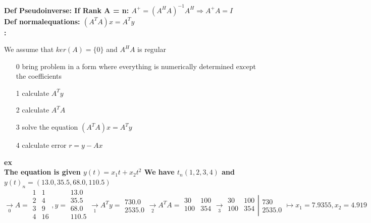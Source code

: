 \documentclass[7pt,landscape, margin = 0.1mm]{article}
\newcommand{\COL}[1]{ \color{chaptercolor} \bf{#1}\color{black}     \\}
\newcommand{\KRZ}[2]{\vspace{1mm} \hline \vspace{1mm} \color{chaptercolor}{RC #1}:\color{black} \   \hspace{0.2cm}\vspace{1mm}   {\begin{minipage}{20em}
#2 \end{minipage}} \vspace{1mm}  \hline \vspace{1mm}  \\}
\newcommand{\DEF}[2]{\color{chaptercolor}\bf{Def #1}:\color{black}    \hspace{0.2cm} #2 \\}
\begin{document}
\begin{multicols}{4}
\begin{flushleft}
\DEF{Pseudoinverse}{If Rank A = n: $A^+= (A^HA)^{-1}A^H \Rightarrow A^+A=I $}
\DEF{normalequations}{$ (A^TA)x = A^Ty  $}
\KRZ{Least Square Method for functions}{We assume that $ ker(A)=\{0\}$ and $A^HA $ is regular
\begin{itemize}
\item[0] bring problem in a form where everything is numerically determined except the coefficients
\item[1] calculate $A^Ty $
\item[2] calculate $A^TA $
\item[3] solve the equation $(A^TA)x = A^Ty $ 
\item[4] calculate error $r = y-Ax $
\end{itemize}
\COL{ex} The equation is given $y(t)= x_1 t + x_2t^2 $ We have $t_n (1,2,3,4)$ and $y(t)_n = (13.0,35.5,68.0,110.5)$
$\xrightarrow[0]{}A=\begin{smallmatrix}
 1&  1\\
 2& 4 \\
 3& 9 \\
4 &  16\\
\end{smallmatrix}, y = \begin{smallmatrix}
 13.0\\
 35.5\\
 68.0 \\
110.5 \\
\end{smallmatrix} \xrightarrow[1]{} A^Ty = \begin{smallmatrix}
730.0 \\ 2535.0 \end{smallmatrix} \xrightarrow[2]{} A^TA = \begin{smallmatrix}
 30&  100\\
100 &  354\\

\end{smallmatrix}\xrightarrow[3]{}\left.\begin{smallmatrix}
30 & 100 \\
 100& 354 \\
\end{smallmatrix}\right|\begin{smallmatrix}
 730\\2535.0
\end{smallmatrix}\mapsto x_1 = 7.9355, x_2 = 4.919 $}







\end{flushleft}
\end{multicols}
\end{document}
